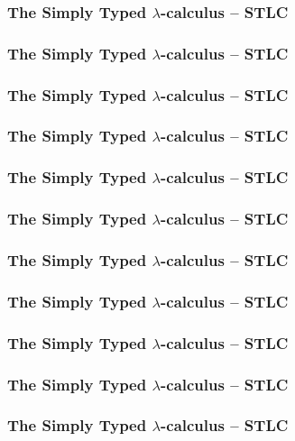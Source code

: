 \begin{frame}
  \frametitle{The Simply Typed $\lambda$-calculus -- STLC}

\end{frame}


\begin{frame}
  \frametitle{The Simply Typed $\lambda$-calculus -- STLC}

\end{frame}

\begin{frame}
  \frametitle{The Simply Typed $\lambda$-calculus -- STLC}

\end{frame}

\begin{frame}
  \frametitle{The Simply Typed $\lambda$-calculus -- STLC}

\end{frame}

\begin{frame}
  \frametitle{The Simply Typed $\lambda$-calculus -- STLC}

\end{frame}

\begin{frame}
  \frametitle{The Simply Typed $\lambda$-calculus -- STLC}

\end{frame}

\begin{frame}
  \frametitle{The Simply Typed $\lambda$-calculus -- STLC}

\end{frame}

\begin{frame}
  \frametitle{The Simply Typed $\lambda$-calculus -- STLC}

\end{frame}

\begin{frame}
  \frametitle{The Simply Typed $\lambda$-calculus -- STLC}

\end{frame}

\begin{frame}
  \frametitle{The Simply Typed $\lambda$-calculus -- STLC}

\end{frame}

\begin{frame}
  \frametitle{The Simply Typed $\lambda$-calculus -- STLC}

\end{frame}

